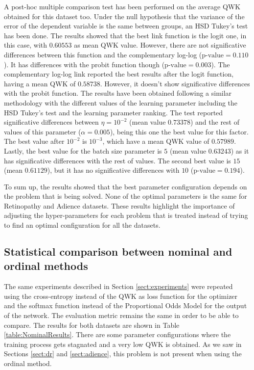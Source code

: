 \documentclass[journal]{IEEEtran}
\begin{document}
	A post-hoc multiple comparison test has been performed on the average QWK obtained for this dataset too. Under the null hypothesis that the variance of the error of the dependent variable is the same between groups, an HSD Tukey's test has been done. The results showed that the best link function is the logit one, in this case, with $0.60553$ as mean QWK value. However, there are not significative differences between this function and the complementary log-log ($\text{p-value}=0.110$). It has differences with the probit function though ($\text{p-value} = 0.003$). The complementary log-log link reported the best results after the logit function, having a mean QWK of $0.58738$. However, it doesn't show significative differences with the probit function.
	The results have been obtained following a similar methodology with the different values of the learning parameter including the HSD Tukey's test and the learning parameter ranking. The test reported significative differences between $\eta=10^{-2}$ (mean value $0.73378$) and the rest of values of this parameter ($\alpha=0.005$), being this one the best value for this factor. The best value after $10^{-2}$ is $10^{-3}$, which have a mean QWK value of $0.57989$. Lastly, the best value for the batch size parameter is $5$ (mean value $0.63243$) as it has significative differences with the rest of values. The second best value is $15$ (mean $0.61129$), but it has no significative differences with $10$ ($\text{p-value}= 0.194$).
	
	To sum up, the results showed that the best parameter configuration depends on the problem that is being solved. None of the optimal parameters is the same for Retinopathy and Adience datasets. These results highlight the importance of adjusting the hyper-parameters for each problem that is treated instead of trying to find an optimal configuration for all the datasets.
	
	\subsection{Statistical comparison between nominal and ordinal methods}
	\label{app:NominalComparison}
	
	The same experiments described in Section \ref{sect:experiments} were repeated using the cross-entropy instead of the QWK as loss function for the optimizer and the softmax function instead of the Proportional Odds Model for the output of the network. The evaluation metric remains the same in order to be able to compare. The results for both datasets are shown in Table \ref{table:NominalResults}. There are some parameter configurations where the training process gets stagnated and a very low QWK is obtained. As we saw in Sections \ref{sect:dr} and \ref{sect:adience}, this problem is not present when using the ordinal method.
	
\end{document}
